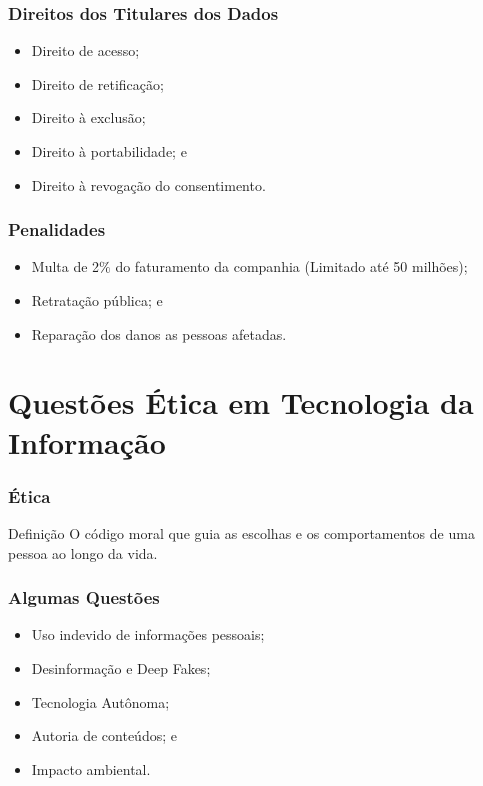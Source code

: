\documentclass[aspectratio=169]{beamer} %
\begin{document}
\begin{frame}
	\frametitle{Direitos dos Titulares dos Dados}
	
	\begin{itemize}
		\item Direito de acesso;
		\item Direito de retificação;
		\item Direito à exclusão;
		\item Direito à portabilidade; e
		\item Direito à revogação do consentimento.
	\end{itemize}
\end{frame}

\begin{frame}
	\frametitle{Penalidades}
	
	\begin{itemize}
		\item Multa de 2$\%$ do faturamento da companhia (Limitado até 50 milhões);
		\item Retratação pública; e
		\item Reparação dos danos as pessoas afetadas.
	\end{itemize}
\end{frame}

\section{Questões Ética em Tecnologia da Informação}

\begin{frame}
	\frametitle{Ética}
	
	\begin{block}{Definição}
		O código moral que guia as escolhas e os comportamentos de uma pessoa ao longo da vida.
	\end{block}
\end{frame}


\begin{frame}
	\frametitle{Algumas Questões}
	
	\begin{itemize}
		\item Uso indevido de informações pessoais;
		\item Desinformação e Deep Fakes;
		\item Tecnologia Autônoma;
		\item Autoria de conteúdos; e
		\item Impacto ambiental.
	\end{itemize}
\end{frame}
\end{document}
